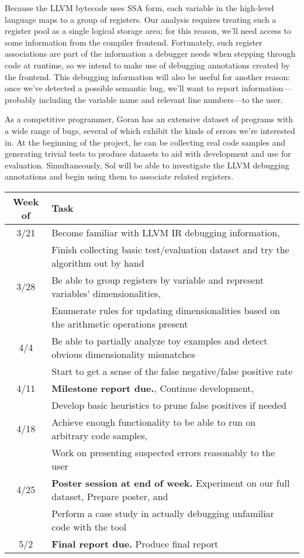 \documentclass[12pt]{article}
\begin{document}
Because the LLVM bytecode uses SSA form, each variable in the high-level language maps to a group of registers.
Our analysis requires treating such a register pool as a single logical storage area; for this reason, we'll need access to some information from the compiler frontend.
Fortunately, such register associations are part of the information a debugger needs when stepping through code at runtime, so we intend to make use of debugging annotations created by the frontend.
This debugging information will also be useful for another reason: once we've detected a possible semantic bug, we'll want to report information---probably including the variable name and relevant line numbers---to the user.

As a competitive programmer, Goran has an extensive dataset of programs with a wide range of bugs, several of which exhibit the kinds of errors we're interested in.
At the beginning of the project, he can be collecting real code samples and generating trivial tests to produce datasets to aid with development and use for evaluation.
Simultaneously, Sol will be able to investigate the LLVM debugging annotations and begin using them to associate related registers.

\noindent
\begin{tabular}{c | l}
Week of & Task \\
\hline
3/21 & Become familiar with LLVM IR debugging information, \\
& Finish collecting basic test/evaluation dataset and try the algorithm out by hand \\
3/28 & Be able to group registers by variable and represent variables' dimensionalities, \\
& Enumerate rules for updating dimensionalities based on the arithmetic operations present \\
4/4 & Be able to partially analyze toy examples and detect obvious dimensionality mismatches \\
& Start to get a sense of the false negative/false positive rate \\
4/11 & \textbf{Milestone report due.}, Continue development, \\
& Develop basic heuristics to prune false positives if needed \\
4/18 & Achieve enough functionality to be able to run on arbitrary code samples, \\
& Work on presenting suspected errors reasonably to the user \\
4/25 & \textbf{Poster session at end of week.} Experiment on our full dataset, Prepare poster, and \\
& Perform a case study in actually debugging unfamiliar code with the tool \\
5/2 & \textbf{Final report due.} Produce final report
\end{tabular}
\end{document}
